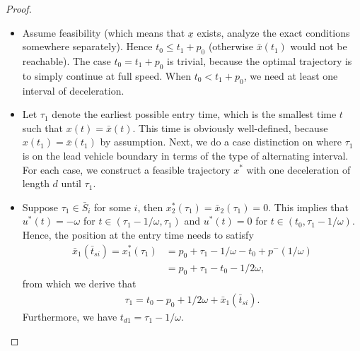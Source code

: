 \documentclass[a4paper]{article}
\theoremstyle{definition}
\theoremstyle{plain}
\begin{document}
\begin{proof}
  \phantom{.}
  \begin{itemize}
    \item Assume feasibility (which means that $\underline{x}$ exists, analyze the exact
          conditions somewhere separately). Hence $t_{0} \leq t_{1} + p_{0}$
          (otherwise $\bar{x}(t_{1})$ would not be reachable). The case
          $t_{0} = t_{1} + p_{0}$ is trivial, because the optimal trajectory is
          to simply continue at full speed. When $t_{0} < t_{1} + p_{0}$, we
          need at least one interval of deceleration.
    \item Let $\tau_{1}$ denote the earliest possible entry time, which is the smallest
          time $t$ such that $x(t) = \bar{x}(t)$. This time is obviously
          well-defined, because $x(t_{1}) = \bar{x}(t_{1})$ by assumption. Next,
          we do a case distinction on where $\tau_{1}$ is on the lead vehicle
          boundary in terms of the type of alternating interval. For each case,
          we construct a feasible trajectory $x^{*}$ with one deceleration of
          length $d$ until $\tau_{1}$.
    \item Suppose $\tau_{1} \in \bar{S}_{i}$ for some $i$, then
          $x_{2}^{*}(\tau_{1}) = \bar{x}_{2}(\tau_{1}) = 0$. This implies that
          $u^{*}(t) = -\omega$ for $t \in (\tau_{1} - 1/\omega, \tau_{1})$ and
          $u^{*}(t) = 0$ for $t \in (t_{0}, \tau_{1} - 1/\omega)$. Hence, the
          position at the entry time needs to satisfy
          \begin{align*}
            \bar{x}_{1}(\bar{t}_{si}) = x^{*}_{1}(\tau_{1}) &= p_{0} + \tau_{1} - 1/\omega - t_{0} + p^{-}(1/\omega) \\
                                &= p_{0} + \tau_{1}- t_{0} -1/2\omega ,
          \end{align*}
          from which we derive that
          \begin{align*}
            \tau_{1} = t_{0} - p_{0} + 1/2\omega + \bar{x}_{1}(\bar{t}_{si}) .
          \end{align*}
          Furthermore, we have $t_{d1} = \tau_{1} - 1/\omega$.


\end{itemize}
\end{proof}
\end{document}
